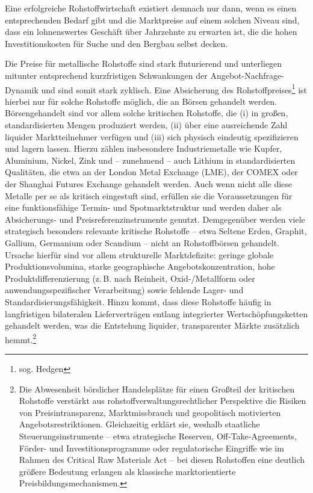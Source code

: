 \documentclass[12pt,a4paper,oneside]{book} %
\begin{document}
	Eine erfolgreiche Rohstoffwirtschaft existiert demnach nur dann, wenn es einen entsprechenden Bedarf gibt und die Marktpreise auf einem solchen Niveau sind, dass ein lohnenswertes Geschäft über Jahrzehnte zu erwarten ist, die die hohen Investitionskosten für Suche und den Bergbau selbst decken.\autocite{Frenz 2025, S. 82.}
	
	Die Preise für metallische Rohstoffe sind stark fluturierend und unterliegen mitunter entsprechend kurzfristigen Schwankungen der Angebot-Nachfrage-Dynamik und sind somit stark zyklisch.\autocite{Pilarsky, S. 42-43} Eine Absicherung des Rohstoffpreises\footnote{sog. Hedgen} ist hierbei nur für solche Rohstoffe möglich, die an Börsen gehandelt werden. Börsengehandelt sind vor allem solche kritischen Rohstoffe, die (i) in großen, standardisierten Mengen produziert werden, (ii) über eine ausreichende Zahl liquider Marktteilnehmer verfügen und (iii) sich physisch eindeutig spezifizieren und lagern lassen. Hierzu zählen insbesondere Industriemetalle wie Kupfer, Aluminium, Nickel, Zink und – zunehmend – auch Lithium in standardisierten Qualitäten, die etwa an der London Metal Exchange (LME), der COMEX oder der Shanghai Futures Exchange gehandelt werden. Auch wenn nicht alle diese Metalle per se als kritisch eingestuft sind, erfüllen sie die Voraussetzungen für eine funktionsfähige Termin- und Spotmarktstruktur und werden daher als Absicherungs‑ und Preisreferenzinstrumente genutzt. Demgegenüber werden viele strategisch besonders relevante kritische Rohstoffe – etwa Seltene Erden, Graphit, Gallium, Germanium oder Scandium – nicht an Rohstoffbörsen gehandelt. Ursache hierfür sind vor allem strukturelle Marktdefizite: geringe globale Produktionsvolumina, starke geographische Angebotskonzentration, hohe Produktdifferenzierung (z. B. nach Reinheit, Oxid‑/Metallform oder anwendungsspezifischer Verarbeitung) sowie fehlende Lager- und Standardisierungsfähigkeit. Hinzu kommt, dass diese Rohstoffe häufig in langfristigen bilateralen Lieferverträgen entlang integrierter Wertschöpfungsketten gehandelt werden, was die Entstehung liquider, transparenter Märkte zusätzlich hemmt.\footnote{Die Abwesenheit börslicher Handelsplätze für einen Großteil der kritischen Rohstoffe verstärkt aus rohstoffverwaltungsrechtlicher Perspektive die Risiken von Preisintransparenz, Marktmissbrauch und geopolitisch motivierten Angebotsrestriktionen. Gleichzeitig erklärt sie, weshalb staatliche Steuerungsinstrumente – etwa strategische Reserven, Off‑Take‑Agreements, Förder- und Investitionsprogramme oder regulatorische Eingriffe wie im Rahmen des Critical Raw Materials Act – bei diesen Rohstoffen eine deutlich größere Bedeutung erlangen als klassische marktorientierte Preisbildungsmechanismen.}
	
\end{document}
